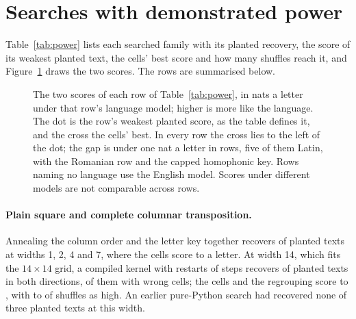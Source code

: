 \documentclass[11pt]{article}
\theoremstyle{definition}
\begin{document}
\section{Searches with demonstrated power}\label{sec:search}

Table~\ref{tab:power} lists each searched family with its planted recovery, the score of its weakest planted text, the cells' best score and how many shuffles reach it, and Figure~\ref{fig:power} draws the two scores. The rows are summarised below.

\begin{table}[t]
\centering
\caption{Searches with demonstrated power. ``Planted found'' counts planted texts recovered with at least 90 percent of letters right. ``Weakest planted'' is the true-key score per letter of the weakest planted text; in rows with slips or wrong cells it is the lowest score at which such a text was found. ``Cells' best'' is the best score per letter over the family on the printed cells and the regrouping together. \textsuperscript{a}~Family-wise: the cells' best over all variants against each shuffle's best over the same variants. The other entries compare the cells' best case with its own shuffles. The repeating-shift row compares the best of 24 cases with 3 shuffles of that case only.}
\label{tab:power}
\small

\end{table}

\begin{figure}[t]
\centering

\caption{The two scores of each row of Table~\ref{tab:power}, in nats a letter under that row's language model; higher is more like the language. The dot is the row's weakest planted score, as the table defines it, and the cross the cells' best. In every row the cross lies to the left of the dot; the gap is under one nat a letter in \gapUnderOne{} rows, five of them Latin, with the Romanian row and the capped homophonic key. Rows naming no language use the English model. Scores under different models are not comparable across rows.}
\label{fig:power}
\end{figure}

\paragraph{Plain square and complete columnar transposition.} Annealing the column order and the letter key together recovers \subRecovered{} of \subPlanted{} planted texts at widths 1, 2, 4 and 7, where the cells score \subCellsLow{} to \subCellsHigh{} a letter. At width 14, which fits the $14 \times 14$ grid, a compiled kernel with \widthFourteenRestarts{} restarts of \widthFourteenSteps{} steps recovers \widthFourteenRecovered{} of \widthFourteenPlanted{} planted texts in both directions, \widthFourteenWithErrors{} of them with \widthFourteenErrors{} wrong cells; the cells and the regrouping score \widthFourteenCellsLow{} to \widthFourteenCellsHigh{}, with \widthFourteenShufflesLow{} to \widthFourteenShufflesHigh{} of \widthFourteenShuffles{} shuffles as high. An earlier pure-Python search had recovered none of three planted texts at this width.
\end{document}
